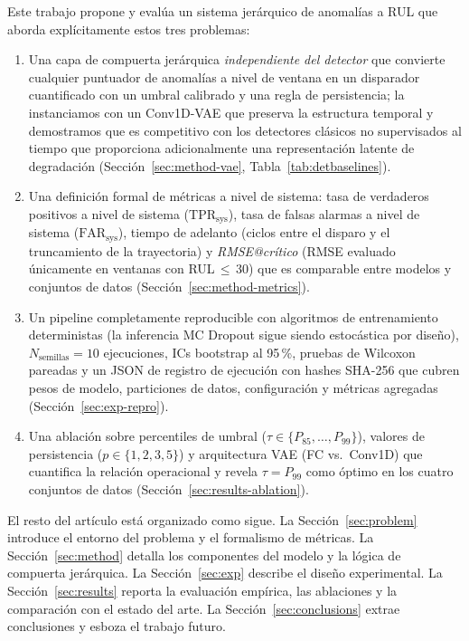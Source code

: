 \documentclass[5p,times,authoryear]{elsarticle}
\begin{document}
Este trabajo propone y evalúa un sistema jerárquico de anomalías a RUL que aborda explícitamente estos tres problemas:
{\sloppy
\begin{enumerate}
    \item Una capa de compuerta jerárquica \emph{independiente del detector} que convierte cualquier puntuador de anomalías a nivel de ventana en un disparador cuantificado con un umbral calibrado y una regla de persistencia; la instanciamos con un Conv1D-VAE que preserva la estructura temporal y demostramos que es competitivo con los detectores clásicos no supervisados al tiempo que proporciona adicionalmente una representación latente de degradación (Sección~\ref{sec:method-vae}, Tabla~\ref{tab:detbaselines}).
    \item Una definición formal de métricas a nivel de sistema: tasa de verdaderos positivos a nivel de sistema ($\mathrm{TPR}_{\mathrm{sys}}$), tasa de falsas alarmas a nivel de sistema ($\mathrm{FAR}_{\mathrm{sys}}$), tiempo de adelanto (ciclos entre el disparo y el truncamiento de la trayectoria) y \emph{RMSE@crítico} (RMSE evaluado únicamente en ventanas con RUL\,$\le$\,30) que es comparable entre modelos y conjuntos de datos (Sección~\ref{sec:method-metrics}).
    \item Un pipeline completamente reproducible con algoritmos de entrenamiento deterministas (la inferencia MC Dropout sigue siendo estocástica por diseño), $N_{\mathrm{semillas}}{=}10$ ejecuciones, ICs bootstrap al 95\,\%, pruebas de Wilcoxon pareadas y un JSON de registro de ejecución con hashes SHA-256 que cubren pesos de modelo, particiones de datos, configuración y métricas agregadas (Sección~\ref{sec:exp-repro}).
    \item Una ablación sobre percentiles de umbral ($\tau\in\{P_{85},\ldots,P_{99}\}$), valores de persistencia ($p\in\{1,2,3,5\}$) y arquitectura VAE (FC vs.\ Conv1D) que cuantifica la relación operacional y revela $\tau{=}P_{99}$ como óptimo en los cuatro conjuntos de datos (Sección~\ref{sec:results-ablation}).
\end{enumerate}
}

El resto del artículo está organizado como sigue. La Sección~\ref{sec:problem} introduce el entorno del problema y el formalismo de métricas. La Sección~\ref{sec:method} detalla los componentes del modelo y la lógica de compuerta jerárquica. La Sección~\ref{sec:exp} describe el diseño experimental. La Sección~\ref{sec:results} reporta la evaluación empírica, las ablaciones y la comparación con el estado del arte. La Sección~\ref{sec:conclusions} extrae conclusiones y esboza el trabajo futuro.
\end{document}
